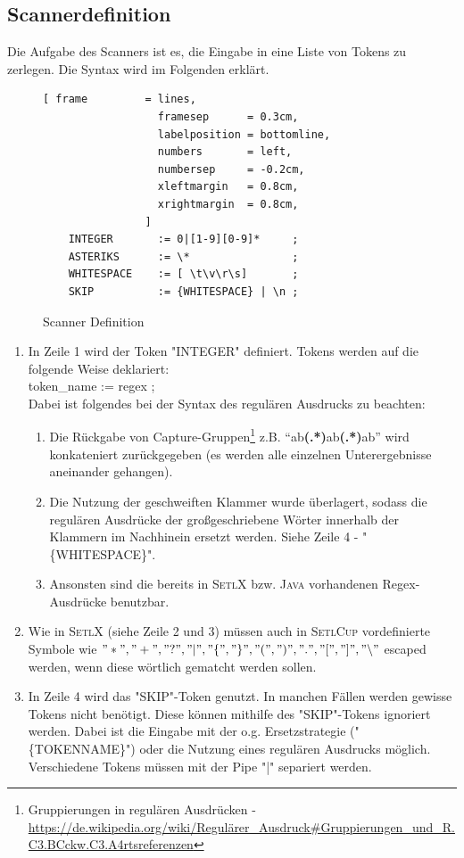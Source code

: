 \subsection{Scannerdefinition}
Die Aufgabe des Scanners ist es, die Eingabe in eine Liste von Tokens zu zerlegen. Die Syntax wird im Folgenden erklärt.
\begin{figure}[!ht]
\begin{Verbatim}[ frame         = lines, 
                  framesep      = 0.3cm, 
                  labelposition = bottomline,
                  numbers       = left,
                  numbersep     = -0.2cm,
                  xleftmargin   = 0.8cm,
                  xrightmargin  = 0.8cm,
                ]
	INTEGER       := 0|[1-9][0-9]*     ;
	ASTERIKS      := \*                ;
	WHITESPACE    := [ \t\v\r\s]       ;
	SKIP          := {WHITESPACE} | \n ;
\end{Verbatim}
\caption{Scanner Definition}
\label{fig:scanner_def}
\end{figure}
\begin{enumerate}
	\item In Zeile 1 wird der Token "INTEGER" definiert. Tokens werden auf die folgende Weise deklariert:\\
					token\_name := regex ; \\
					Dabei ist folgendes bei der Syntax des regulären Ausdrucks zu beachten:
					\begin{enumerate}
						\item Die Rückgabe von Capture-Gruppen\footnote{Gruppierungen in regulären Ausdrücken -  \url{https://de.wikipedia.org/wiki/Regulärer_Ausdruck\#Gruppierungen_und_R.C3.BCckw.C3.A4rtsreferenzen}} z.B. "`ab\textbf{(.*)}ab\textbf{(.*)}ab"'	wird konkateniert zurückgegeben (es werden alle einzelnen Unterergebnisse aneinander gehangen).
						\item Die Nutzung der geschweiften Klammer wurde überlagert, sodass die regulären Ausdrücke der großgeschriebene Wörter innerhalb der Klammern im Nachhinein ersetzt werden. Siehe Zeile 4 - "\{WHITESPACE\}".
						\item Ansonsten sind die bereits in \textsc{SetlX} bzw. \textsc{Java} vorhandenen Regex-Ausdrücke benutzbar.
					\end{enumerate}
	\item Wie in \textsc{SetlX} (siehe Zeile 2 und 3) müssen auch in \textsc{SetlCup} vordefinierte Symbole wie $"*","+","?","|","\{","\}","(",")",".","[","]","\backslash"$ escaped werden, wenn diese wörtlich gematcht werden sollen.
	\item In Zeile 4 wird das "SKIP"-Token genutzt. In manchen Fällen werden gewisse Tokens nicht benötigt. Diese können mithilfe des "SKIP"-Tokens ignoriert werden. Dabei ist die Eingabe mit der o.g. Ersetzstrategie ("\{TOKENNAME\}") oder die Nutzung eines regulären Ausdrucks möglich. Verschiedene Tokens müssen mit der Pipe "|" separiert werden.
\end{enumerate}


